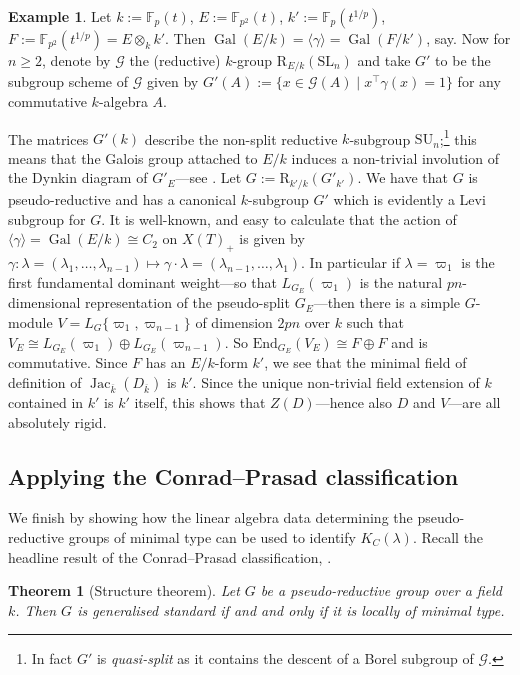 \documentclass[11pt,reqno]{amsart}
\newtheorem{theorem}[lemma]{Theorem}
\theoremstyle{definition}
\newtheorem{example}[lemma]{Example}
\theoremstyle{remark}
\theoremstyle{definition}
\theoremstyle{plain}
\DeclareMathOperator{\Gal}{Gal}
\DeclareMathOperator{\Jac}{Jac}
\newcommand{\R}{\mathrm{R}}
\newcommand{\G}{\mathscr{G}}
\newcommand{\GG}{\mathcal{G}}
\newcommand{\SL}{\mathrm{SL}}
\newcommand{\SU}{\mathrm{SU}}
\newcommand{\End}{\mathrm{End}}
\newcommand{\F}{\mathbb{F}}
\newcommand{\bark}{{\overline{k}}}
\begin{document}
\begin{example}
  Let $k:=\F_p(t)$, $E:=\F_{p^2}(t)$, $k':=\F_p(t^{1/p})$, $F:=\F_{p^2}(t^{1/p})=E\otimes_k k'$. Then $\Gal(E/k)=\langle \gamma\rangle=\Gal(F/k')$, say. Now for $n\geq 2$, denote by $\G$ the (reductive) $k$-group $\R_{E/k}(\SL_n)$ and take $G'$ to be the subgroup scheme of $\G$ given by $G'(A):=\{x\in \G(A)\mid x^\intercal\gamma(x)=1\}$ for any commutative $k$-algebra $A$. 

  The matrices $G'(k)$ describe the non-split reductive $k$-subgroup $\SU_n$;\footnote{In fact $G'$ is \emph{quasi-split} as it contains the descent of a Borel subgroup of $\GG$.} this means that the Galois group attached to $E/k$ induces a non-trivial involution of the Dynkin diagram of ${G'}_E$---see \cite[\S24.f]{Milne17}. Let $G:=\R_{k'/k}({G'}_{k'})$. We have that $G$ is pseudo-reductive and has a canonical $k$-subgroup $G'$ which is evidently a Levi subgroup for $G$. It is well-known, and easy to calculate that the action of $\langle\gamma\rangle=\Gal(E/k)\cong C_2$ on $X(T)_+$ is given by $\gamma: \lambda=(\lambda_1,\dots,\lambda_{n-1})\mapsto \gamma\cdot\lambda=(\lambda_{n-1},\dots,\lambda_1)$. In particular if $\lambda=\varpi_1$ is the first fundamental dominant weight---so that $L_{G_E}(\varpi_1)$ is the natural $pn$-dimensional representation of the pseudo-split $G_{E}$---then there is a simple $G$-module $V=L_G\{\varpi_1,\varpi_{n-1}\}$ of dimension $2pn$ over $k$ such that $V_E\cong L_{G_E}(\varpi_1)\oplus L_{G_E}(\varpi_{n-1})$. So $\End_{G_E}(V_E)\cong F\oplus F$ and is commutative. Since $F$ has an $E/k$-form $k'$, we see that the minimal field of definition of   $\Jac_{\bark}(D_\bark)$ is $k'$. Since the unique non-trivial field extension of $k$ contained in $k'$ is $k'$ itself, this shows that $Z(D)$---hence also $D$ and $V$---are all absolutely rigid.
\end{example}

\subsection{Applying the Conrad--Prasad classification}
We finish by showing how the linear algebra data determining the pseudo-reductive groups of minimal type can be used to identify $K_C(\lambda)$. Recall the headline result of the Conrad--Prasad classification, \cite[Thm.~9.2.1]{CPClass}.

\begin{theorem}[Structure theorem]
  Let $G$ be a pseudo-reductive group over a field $k$. Then $G$ is generalised standard if and and only if it is locally of minimal type.
\end{theorem}
\end{document}
